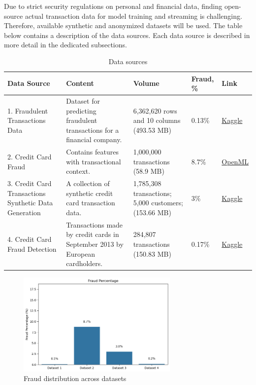 \documentclass[12pt,a4paper, hidelinks]{article}
\begin{document}
Due to strict security regulations on personal and financial data, finding open-source actual transaction data for model training and streaming is challenging. Therefore, available synthetic and anonymized datasets will be used. The table below contains a description of the data sources. Each data source is described in more detail in the dedicated subsections.

\begin{table}[h!]
\centering


\begin{tabular}{|p{4.8cm}|p{3.5cm}|p{2cm}|p{2cm}|p{1.5cm}|}
\hline
\textbf{Data Source} & \textbf{Content} & \textbf{Volume} &  \textbf{Fraud, \%} & \textbf{Link} \\
\hline
1. Fraudulent Transactions Data &  Dataset for predicting fraudulent transactions for a financial company. &  6,362,620 rows and 10 columns (493.53 MB) & 0.13\% & \href{https://www.kaggle.com/datasets/chitwanmanchanda/fraudulent-transactions-data}{Kaggle} \\
\hline
2. Credit Card Fraud & Contains features with transactional context. & 1,000,000 transactions (58.9 MB) & 8.7\% & \href{https://www.openml.org/search?type=data\&status=active\&id=45955}{OpenML} \\
\hline
3. Credit Card Transactions Synthetic Data Generation & A collection of synthetic credit card transaction data. & 1,785,308 transactions; 5,000 customers; (153.66 MB) & 3\% & \href{https://www.kaggle.com/datasets/cgrodrigues/credit-card-transactions-synthetic-data-generation?select=transactions_df.csv}{Kaggle} \\
\hline
4. Credit Card Fraud Detection & Transactions made by credit cards in September 2013 by European cardholders. & 284,807 transactions (150.83 MB) & 0.17\% & \href{https://www.kaggle.com/datasets/mlg-ulb/creditcardfraud}{Kaggle} \\
\hline
\end{tabular}

\caption{Data sources}
\end{table}

\begin{figure}[h!]
    \centering
    \includegraphics[width=0.7\textwidth]{images/fraud-distribution.png}
    \caption{Fraud distribution across datasets}
    \label{fig:fraudDistribution}
\end{figure}
\end{document}
